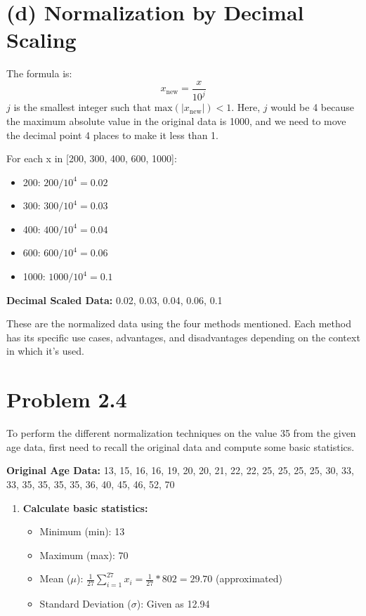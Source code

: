 \documentclass{article}
\begin{document}
\section*{(d) Normalization by Decimal Scaling}
The formula is:
\[
x_{\text{new}} = \frac{x}{10^j}
\]
$j$ is the smallest integer such that $\text{max}(|x_{\text{new}}|) < 1$. Here, $j$ would be 4 because the maximum absolute value in the original data is 1000, and we need to move the decimal point 4 places to make it less than 1.

For each x in [200, 300, 400, 600, 1000]:
\begin{itemize}
  \item 200: $200 / 10^4 = 0.02$
  \item 300: $300 / 10^4 = 0.03$
  \item 400: $400 / 10^4 = 0.04$
  \item 600: $600 / 10^4 = 0.06$
  \item 1000: $1000 / 10^4 = 0.1$
\end{itemize}
\textbf{Decimal Scaled Data:} 0.02, 0.03, 0.04, 0.06, 0.1

These are the normalized data using the four methods mentioned. Each method has its specific use cases, advantages, and disadvantages depending on the context in which it's used.

\section*{Problem 2.4}

\noindent To perform the different normalization techniques on the value 35 from the given age data, first need to recall the original data and compute some basic statistics.

\noindent \textbf{Original Age Data:} 13, 15, 16, 16, 19, 20, 20, 21, 22, 22, 25, 25, 25, 25, 30, 33, 33, 35, 35, 35, 35, 36, 40, 45, 46, 52, 70

\begin{enumerate}
  \item \textbf{Calculate basic statistics:}
  \begin{itemize}
    \item Minimum (min): 13
    \item Maximum (max): 70
    \item Mean ($\mu$): $\frac{1}{27}\sum_{i=1}^{27} x_i = \frac{1}{27} * 802 = 29.70$ (approximated)
    \item Standard Deviation ($\sigma$): Given as 12.94
  \end{itemize}
\end{enumerate}
\end{document}
